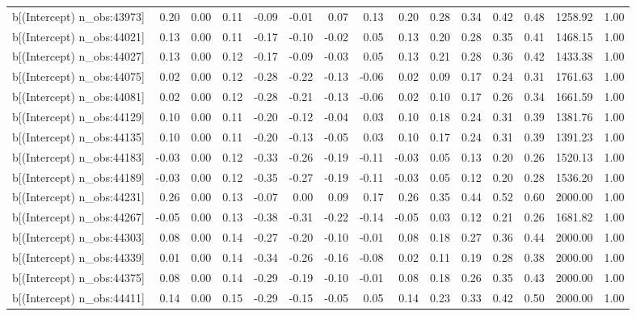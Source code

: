 \begin{table}[ht]
\begin{tabular}{rrrrrrrrrrrrrrr}
  b[(Intercept) n\_obs:43973] & 0.20 & 0.00 & 0.11 & -0.09 & -0.01 & 0.07 & 0.13 & 0.20 & 0.28 & 0.34 & 0.42 & 0.48 & 1258.92 & 1.00 \\ 
  b[(Intercept) n\_obs:44021] & 0.13 & 0.00 & 0.11 & -0.17 & -0.10 & -0.02 & 0.05 & 0.13 & 0.20 & 0.28 & 0.35 & 0.41 & 1468.15 & 1.00 \\ 
  b[(Intercept) n\_obs:44027] & 0.13 & 0.00 & 0.12 & -0.17 & -0.09 & -0.03 & 0.05 & 0.13 & 0.21 & 0.28 & 0.36 & 0.42 & 1433.38 & 1.00 \\ 
  b[(Intercept) n\_obs:44075] & 0.02 & 0.00 & 0.12 & -0.28 & -0.22 & -0.13 & -0.06 & 0.02 & 0.09 & 0.17 & 0.24 & 0.31 & 1761.63 & 1.00 \\ 
  b[(Intercept) n\_obs:44081] & 0.02 & 0.00 & 0.12 & -0.28 & -0.21 & -0.13 & -0.06 & 0.02 & 0.10 & 0.17 & 0.26 & 0.34 & 1661.59 & 1.00 \\ 
  b[(Intercept) n\_obs:44129] & 0.10 & 0.00 & 0.11 & -0.20 & -0.12 & -0.04 & 0.03 & 0.10 & 0.18 & 0.24 & 0.31 & 0.39 & 1381.76 & 1.00 \\ 
  b[(Intercept) n\_obs:44135] & 0.10 & 0.00 & 0.11 & -0.20 & -0.13 & -0.05 & 0.03 & 0.10 & 0.17 & 0.24 & 0.31 & 0.39 & 1391.23 & 1.00 \\ 
  b[(Intercept) n\_obs:44183] & -0.03 & 0.00 & 0.12 & -0.33 & -0.26 & -0.19 & -0.11 & -0.03 & 0.05 & 0.13 & 0.20 & 0.26 & 1520.13 & 1.00 \\ 
  b[(Intercept) n\_obs:44189] & -0.03 & 0.00 & 0.12 & -0.35 & -0.27 & -0.19 & -0.11 & -0.03 & 0.05 & 0.12 & 0.20 & 0.28 & 1536.20 & 1.00 \\ 
  b[(Intercept) n\_obs:44231] & 0.26 & 0.00 & 0.13 & -0.07 & 0.00 & 0.09 & 0.17 & 0.26 & 0.35 & 0.44 & 0.52 & 0.60 & 2000.00 & 1.00 \\ 
  b[(Intercept) n\_obs:44267] & -0.05 & 0.00 & 0.13 & -0.38 & -0.31 & -0.22 & -0.14 & -0.05 & 0.03 & 0.12 & 0.21 & 0.26 & 1681.82 & 1.00 \\ 
  b[(Intercept) n\_obs:44303] & 0.08 & 0.00 & 0.14 & -0.27 & -0.20 & -0.10 & -0.01 & 0.08 & 0.18 & 0.27 & 0.36 & 0.44 & 2000.00 & 1.00 \\ 
  b[(Intercept) n\_obs:44339] & 0.01 & 0.00 & 0.14 & -0.34 & -0.26 & -0.16 & -0.08 & 0.02 & 0.11 & 0.19 & 0.28 & 0.38 & 2000.00 & 1.00 \\ 
  b[(Intercept) n\_obs:44375] & 0.08 & 0.00 & 0.14 & -0.29 & -0.19 & -0.10 & -0.01 & 0.08 & 0.18 & 0.26 & 0.35 & 0.43 & 2000.00 & 1.00 \\ 
  b[(Intercept) n\_obs:44411] & 0.14 & 0.00 & 0.15 & -0.29 & -0.15 & -0.05 & 0.05 & 0.14 & 0.23 & 0.33 & 0.42 & 0.50 & 2000.00 & 1.00 \\ 

\end{tabular}
\end{table}
